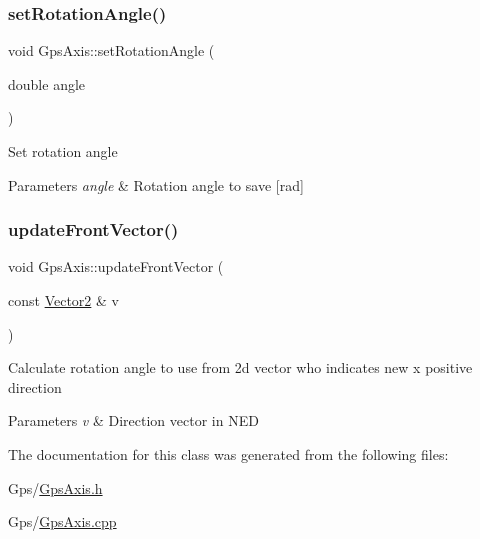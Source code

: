 \subsubsection{\texorpdfstring{set\+Rotation\+Angle()}{setRotationAngle()}}
{\footnotesize\ttfamily void Gps\+Axis\+::set\+Rotation\+Angle (\begin{DoxyParamCaption}\item[{double}]{angle }\end{DoxyParamCaption})}

Set rotation angle 
\begin{DoxyParams}{Parameters}
{\em angle} & Rotation angle to save \mbox{[}rad\mbox{]} \\
\hline
\end{DoxyParams}
\mbox{\label{class_m210_1_1_gps_axis_a89a2b85d3f6b644fd3b4836dcd69c88b}} 
\subsubsection{\texorpdfstring{update\+Front\+Vector()}{updateFrontVector()}}
{\footnotesize\ttfamily void Gps\+Axis\+::update\+Front\+Vector (\begin{DoxyParamCaption}\item[{const \mbox{\hyperlink{struct_vector2}{Vector2}} \&}]{v }\end{DoxyParamCaption})}

Calculate rotation angle to use from 2d vector who indicates new x positive direction 
\begin{DoxyParams}{Parameters}
{\em v} & Direction vector in N\+ED \\
\hline
\end{DoxyParams}


The documentation for this class was generated from the following files\+:\begin{DoxyCompactItemize}
\item 
Gps/\mbox{\hyperlink{_gps_axis_8h}{Gps\+Axis.\+h}}\item 
Gps/\mbox{\hyperlink{_gps_axis_8cpp}{Gps\+Axis.\+cpp}}\end{DoxyCompactItemize}
